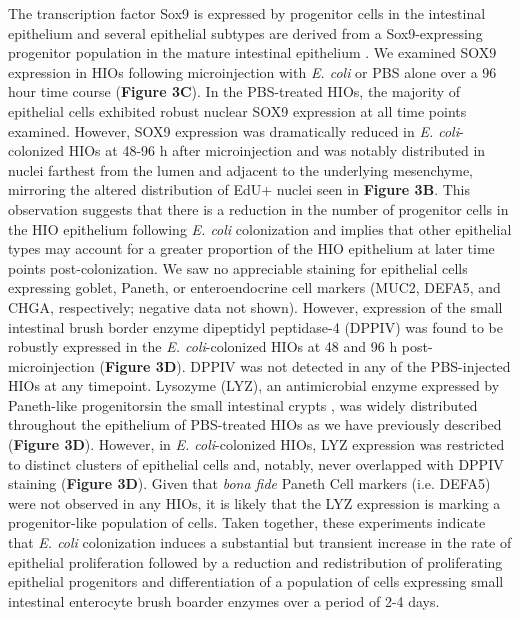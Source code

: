 \documentclass[9pt,lineo]{elife}
\begin{document}
The transcription factor Sox9 is expressed by progenitor cells in the intestinal epithelium \citep{Bastide:2007,Mori-Akiyama:2007} and several epithelial subtypes are derived from a Sox9-expressing progenitor population in the mature intestinal epithelium \citep{Bastide:2007,Furuyama:2011}. We examined SOX9 expression in HIOs following microinjection with \emph{E. coli} or PBS alone over a 96 hour time course (\textbf{Figure 3C}). In the PBS-treated HIOs, the majority of epithelial cells exhibited robust nuclear SOX9 expression at all time points examined. However, SOX9 expression was dramatically reduced in \emph{E. coli}-colonized HIOs at 48-96 h after microinjection and was notably distributed in nuclei farthest from the lumen and adjacent to the underlying mesenchyme, mirroring the altered distribution of EdU+ nuclei seen in \textbf{Figure 3B}. This observation suggests that there is a reduction in the number of progenitor cells in the HIO epithelium following \emph{E. coli} colonization and implies that other epithelial types may account for a greater proportion of the HIO epithelium at later time points post-colonization. We saw no appreciable staining for epithelial cells expressing goblet, Paneth, or enteroendocrine cell markers (MUC2, DEFA5, and CHGA, respectively; negative data not shown). However, expression of the small intestinal brush border enzyme dipeptidyl peptidase-4 (DPPIV) was found to be robustly expressed in the \emph{E. coli}-colonized HIOs at 48 and 96 h post-microinjection (\textbf{Figure 3D}). DPPIV was not detected in any of the PBS-injected HIOs at any timepoint. Lysozyme (LYZ), an antimicrobial enzyme expressed by Paneth-like progenitorsin the small intestinal crypts \cite{Bevins:2011}, was widely distributed throughout the epithelium of PBS-treated HIOs as we have previously described \citep{Spence:2011}(\textbf{Figure 3D}). However, in \emph{E. coli}-colonized HIOs, LYZ expression was restricted to distinct clusters of epithelial cells and, notably, never overlapped with DPPIV staining (\textbf{Figure 3D}). Given that \emph{bona fide} Paneth Cell markers (i.e. DEFA5) were not observed in any HIOs, it is likely that the LYZ expression is marking a progenitor-like population of cells. Taken together, these experiments indicate that \emph{E. coli} colonization induces a substantial but transient increase in the rate of epithelial proliferation followed by a reduction and redistribution of proliferating epithelial progenitors and differentiation of a population of cells expressing small intestinal enterocyte brush boarder enzymes over a period of 2-4 days.
\end{document}
